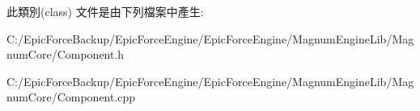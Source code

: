 此類別(class) 文件是由下列檔案中產生\+:\begin{DoxyCompactItemize}
\item 
C\+:/\+Epic\+Force\+Backup/\+Epic\+Force\+Engine/\+Epic\+Force\+Engine/\+Magnum\+Engine\+Lib/\+Magnum\+Core/Component.\+h\item 
C\+:/\+Epic\+Force\+Backup/\+Epic\+Force\+Engine/\+Epic\+Force\+Engine/\+Magnum\+Engine\+Lib/\+Magnum\+Core/Component.\+cpp\end{DoxyCompactItemize}
